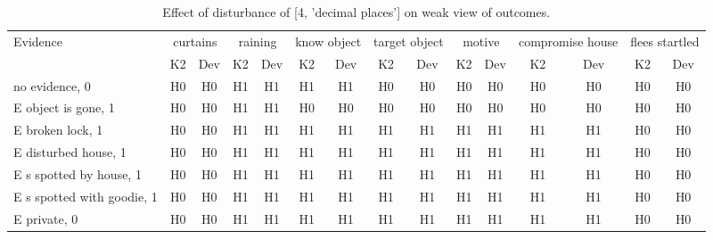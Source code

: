 \begin{table}\begin{tabular}{l|cc|cc|cc|cc|cc|cc|cc}\toprule\multirow{2}{*}{Evidence} & \multicolumn{2}{c}{curtains}& \multicolumn{2}{c}{raining}& \multicolumn{2}{c}{know object}& \multicolumn{2}{c}{target object}& \multicolumn{2}{c}{motive}& \multicolumn{2}{c}{compromise house}& \multicolumn{2}{c}{flees startled}\\& {K2} & {Dev}& {K2} & {Dev}& {K2} & {Dev}& {K2} & {Dev}& {K2} & {Dev}& {K2} & {Dev}& {K2} & {Dev}\\\midrule
no evidence, 0 & H0&H0&H1&H1&H1&H1&H0&H0&H0&H0&H0&H0&H0&H0\\E object is gone, 1 & H0&H0&H1&H1&H0&H0&H0&H0&H0&H0&H0&H0&H0&H0\\E broken lock, 1 & H0&H0&H1&H1&H1&H1&H1&H1&H1&H1&H1&H1&H0&H0\\E disturbed house, 1 & H0&H0&H1&H1&H1&H1&H1&H1&H1&H1&H1&H1&H0&H0\\E s spotted by house, 1 & H0&H0&H1&H1&H1&H1&H1&H1&H1&H1&H1&H1&H0&H0\\E s spotted with goodie, 1 & H0&H0&H1&H1&H1&H1&H1&H1&H1&H1&H1&H1&H0&H0\\E private, 0 & H0&H0&H1&H1&H1&H1&H1&H1&H1&H1&H1&H1&H0&H0\\\bottomrule\end{tabular}\caption{Effect of disturbance of [4, 'decimal places'] on weak view of outcomes.}\end{table}